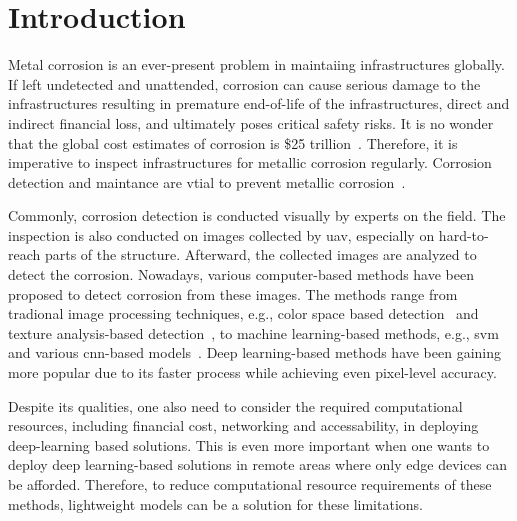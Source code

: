 \documentclass[mathematics,article,submit,pdftex,moreauthors]{Definitions/mdpi}
\begin{document}
\section{Introduction}

Metal corrosion is an ever-present problem in maintaiing 
infrastructures globally. If left undetected
and unattended, corrosion can cause serious damage to the infrastructures
resulting in premature end-of-life of the infrastructures,
direct and indirect financial loss, 
and ultimately poses critical safety risks. It 
is no wonder that the global cost estimates of
corrosion is \$25 trillion~\cite{Koch2016}.
Therefore, it is imperative to
inspect infrastructures for metallic corrosion
regularly. Corrosion detection and maintance
are vtial to prevent metallic corrosion~\cite{Wang2019}.

Commonly, corrosion detection is conducted 
visually by experts on the field. The inspection is 
also conducted on images collected by \ac{uav}, especially
on hard-to-reach parts of the structure.
Afterward, the collected images are analyzed to detect
the corrosion. Nowadays, various computer-based
methods have been proposed to detect corrosion
from these images. The methods range from
tradional image processing techniques,
e.g., color space based detection~\cite{Igoe2016} 
and texture analysis-based detection~\cite{Pascual2014},
to machine learning-based methods, e.g.,
\ac{svm}~\cite{Chen2012} and various 
\ac{cnn}-based models~\cite{Nash2022, Liu2023}.
Deep learning-based methods have been gaining more
popular due to its faster process while achieving
even pixel-level accuracy. 

Despite its qualities, one also need to consider
the required computational resources, including
financial cost, networking and accessability,
in deploying deep-learning based solutions.
This is even more important when one wants to 
deploy deep learning-based solutions in remote
areas where only edge devices can be afforded.
Therefore, to reduce computational resource requirements
of these methods, lightweight 
models can be a solution for these limitations.
\end{document}
